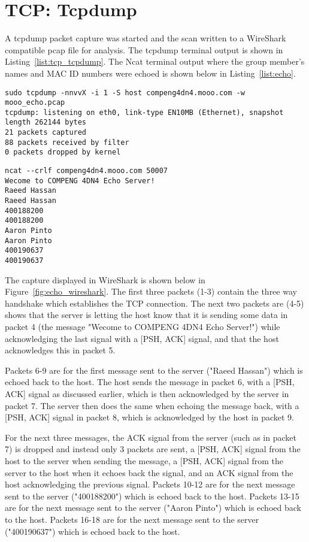 \section*{TCP: Tcpdump}
A tcpdump packet capture was started and the scan written to a WireShark compatible pcap file for analysis. The tcpdump terminal output is shown in Listing~\ref{list:tcp_tcpdump}. The Ncat terminal output where the group member's names and MAC ID numbers were echoed is shown below in Listing~\ref{list:echo}.

\begin{lstlisting}[caption=Tcpdump Packet Capture of Python Echo Server Connection,label=list:tcp_tcpdump]
sudo tcpdump -nnvvX -i 1 -S host compeng4dn4.mooo.com -w mooo_echo.pcap
tcpdump: listening on eth0, link-type EN10MB (Ethernet), snapshot length 262144 bytes
21 packets captured
88 packets received by filter
0 packets dropped by kernel
\end{lstlisting}

\begin{lstlisting}[caption=Ncat Connection to Python Echo Server,label=list:echo]
ncat --crlf compeng4dn4.mooo.com 50007
Wecome to COMPENG 4DN4 Echo Server!
Raeed Hassan
Raeed Hassan
400188200
400188200
Aaron Pinto
Aaron Pinto
400190637
400190637
\end{lstlisting}

The capture displayed in WireShark is shown below in Figure~\ref{fig:echo_wireshark}. The first three packets (1-3) contain the three way handshake which establishes the TCP connection. The next two packets are (4-5) shows that the server is letting the host know that it is sending some data in packet 4 (the message "Wecome to COMPENG 4DN4 Echo Server!") while acknowledging the last signal with a [PSH, ACK] signal, and that the host acknowledges this in packet 5. 

Packets 6-9 are for the first message sent to the server ("Raeed Hassan") which is echoed back to the host. The host sends the message in packet 6, with a [PSH, ACK] signal as discussed earlier, which is then acknowledged by the server in packet 7. The server then does the same when echoing the message back, with a [PSH, ACK] signal in packet 8, which is acknowledged by the host in packet 9. 

For the next three messages, the ACK signal from the server (such as in packet 7) is dropped and instead only 3 packets are sent, a [PSH, ACK] signal from the host to the server when sending the message, a [PSH, ACK] signal from the server to the host when it echoes back the signal, and an ACK signal from the host acknowledging the previous signal. Packets 10-12 are for the next message sent to the server ("400188200") which is echoed back to the host. Packets 13-15 are for the next message sent to the server ("Aaron Pinto") which is echoed back to the host. Packets 16-18 are for the next message sent to the server ("400190637") which is echoed back to the host. 

